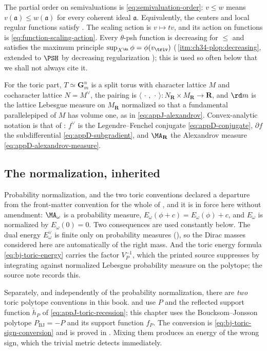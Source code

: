 The partial order on semivaluations is \eqref{eq:semivaluation-order}:
$v\le w$ means $v(\mathfrak a)\le w(\mathfrak a)$ for every
coherent ideal $\mathfrak a$.  Equivalently, the centers and local regular
functions satisfy .  The
scaling action is $v\mapsto tv$, and its action on functions is
\eqref{eq:function-scaling-action}.  Every $\theta$-psh function is
decreasing for $\le$ and satisfies the maximum principle
$\sup_{X^{\An}}\phi=\phi(v_{\triv})$
(\,\cref{itm:ch34-plop:decreasing}, extended
to $\PSH$ by decreasing regularization
); this is used so often below that we
shall not always cite it.

For the toric part, $T\simeq\mathbf G_m^n$ is a split torus with
character lattice $M$ and cocharacter lattice $N=M^\vee$, the pairing
is $\langle\,\cdot\,,\,\cdot\,\rangle:N_{\mathbf R}\times M_{\mathbf R}\to
\mathbf R$, and $\rd m$ is the lattice Lebesgue measure on
$M_{\mathbf R}$ normalized so that a fundamental parallelepiped of $M$
has volume one, as in \eqref{eq:appJ-alexandrov}.  Convex-analytic notation
is that of : $f^\vee$ is the Legendre--Fenchel
conjugate \eqref{eq:appD-conjugate}, $\partial f$ the subdifferential
\eqref{eq:appD-subgradient}, and $\MA_{\mathbf R}$ the Alexandrov measure
\eqref{eq:appD-alexandrov-measure}.

\subsection{The normalization, inherited}
\label{sec:ch49-normalization}

\begin{warning}{Probability normalization, and the two toric conventions}
\label{warn:ch49-normalization}
 declared a departure from the front-matter
convention for the whole of
, and it is in force here
without amendment: $\MA_\omega$ is a probability measure,
$E_\omega(\phi+c)=E_\omega(\phi)+c$, and $E_\omega$ is normalized by
$E_\omega(0)=0$.  Two consequences are used constantly below.  The dual
energy $E^\vee_\omega$ is finite only on probability measures
(), so the Dirac masses considered here are
automatically of the right mass.  And the toric energy formula
\eqref{eq:bj-toric-energy} carries the factor $V_P^{-1}$, which the
printed source suppresses by integrating against normalized Lebesgue
probability measure on the polytope; the source note
 records this.

Separately, and independently of the probability normalization, there are
\emph{two} toric polytope conventions in this book.
 and  use $P$ and
the reflected support function $\check h_P$ of
\eqref{eq:appJ-toric-recession}; this chapter uses the Boucksom--Jonsson
polytope $P_{\mathrm{BJ}}=-P$ and its support function $f_P$.  The
conversion is \eqref{eq:bj-toric-sign-conversion} and is proved in
.  Mixing them produces an energy of the wrong
sign, which the trivial metric detects immediately.
\end{warning}

